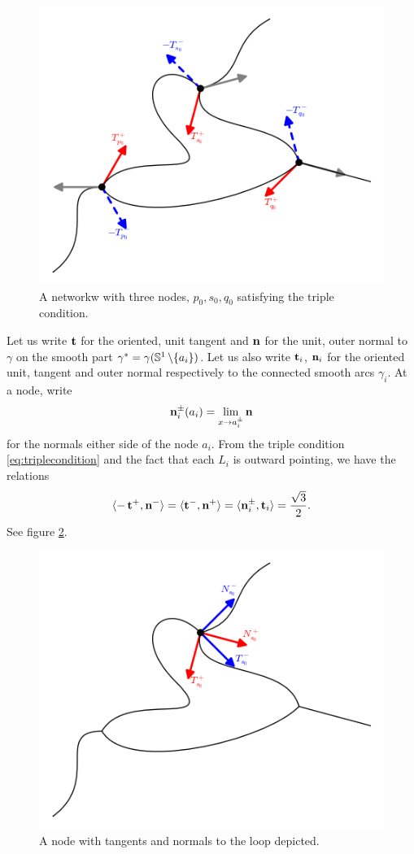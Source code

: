 \documentclass[11pt]{amsart}
\begin{document}
\begin{figure}[htb]
\centering
\includegraphics[width=.9\linewidth]{network}
\caption{A networkw with three nodes, $p_0, s_0, q_0$ satisfying the triple condition.}
\label{fg:network}
\end{figure}

Let us write \(\operatorname{\mathbf{t}}\) for the oriented, unit tangent and \(\operatorname{\mathbf{n}}\) for the unit, outer normal to \(\gamma\) on the smooth part \(\gamma^{\ast} = \gamma(\mathbb{S}^1\operatorname{\backslash}\{a_i\})\). Let us also write \(\operatorname{\mathbf{t}}_i\), \(\operatorname{\mathbf{n}}_i\) for the oriented unit, tangent and outer normal respectively to the connected smooth arcs \(\gamma_i\). At a node, write
\[
\operatorname{\mathbf{n}}_i^{\pm}(a_i) = \lim_{x\to a_i^{\pm}} \operatorname{\mathbf{n}}
\]
for the normals either side of the node \(a_i\). From the triple condition \eqref{eq:triplecondition} and the fact that each \(L_i\) is outward pointing, we have the relations
\begin{equation}
\label{eq:triplerelations}
\langle{-\operatorname{\mathbf{t}}^+},{\operatorname{\mathbf{n}}^-}\rangle = \langle{\operatorname{\mathbf{t}}^-},{\operatorname{\mathbf{n}}^+}\rangle = \langle{\operatorname{\mathbf{n}}_i^{\pm}},{\operatorname{\mathbf{t}}_i}\rangle = \frac{\sqrt{3}}{2}.
\end{equation}
See figure \ref{fg:node}.
\begin{figure}[htb]
\centering
\includegraphics[width=.9\linewidth]{node}
\caption{A node with tangents and normals to the loop depicted.}
\label{fg:node}
\end{figure}
\end{document}
